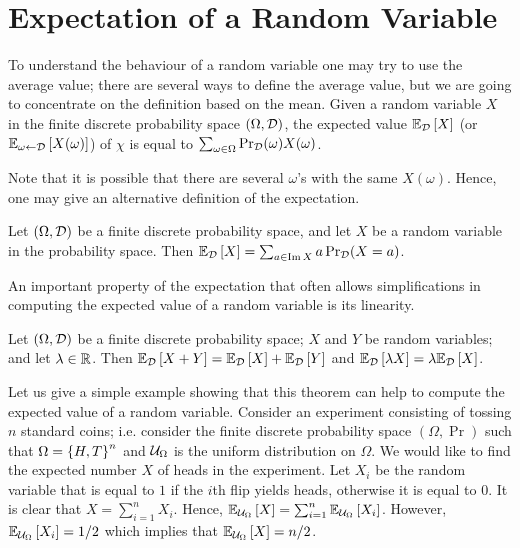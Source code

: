 \chapter{Expectation of a Random Variable}
\label{chapter:expectation}
To understand the behaviour of a random variable one may try to use the average
value; there are several ways to define the average value, but we are going to
concentrate on the definition based on the mean. Given a random variable $X$
in the finite discrete probability space $(\Omega, \Distribution{D})$, the
expected value $\expectation[\Distribution{D}]{X}$ 
(or $\expectation[\omega \gets \Distribution{D}]{X(\omega)}$) of $\chi$ is equal to
$\sum_{\omega \in \Omega} \Pr_{\Distribution{D}}(\omega) X(\omega)$.

Note that it is possible that there are several $\omega$'s with the same
$X(\omega)$. Hence, one may give an alternative definition of the expectation.
\begin{theorem}
  Let $(\Omega, \Distribution{D})$ be a finite discrete probability space, and
  let $X$ be a random variable in the probability space. Then
  $\expectation[\Distribution{D}]{X} =
  \sum_{a \in \Im X} a\Pr_{\Distribution{D}}(X = a)$.
\end{theorem}

An important property of the expectation that often allows simplifications in
computing the expected value of a random variable is its linearity.
\begin{theorem}
  Let $(\Omega, \Distribution{D})$ be a finite discrete probability space; $X$
  and $Y$ be random variables; and let $\lambda \in \R$.
  Then $\expectation[\Distribution{D}]{X + Y} = 
    \expectation[\Distribution{D}]{X} + \expectation[\Distribution{D}]{Y}$ and
  $\expectation[\Distribution{D}]{\lambda X} = \lambda
  \expectation[\Distribution{D}]{X}$.
\end{theorem}
Let us give a simple example showing that this theorem can help to compute the
expected value of a random variable. Consider an experiment consisting of
tossing $n$ standard coins; i.e. consider the finite discrete probability space
$(\Omega, \Pr)$ such that $\Omega = \set{H, T}^n$ and $\Uniform{\Omega}$ is the
uniform distribution on $\Omega$. We would like to find the expected number $X$
of heads in the experiment. Let $X_i$ be the random variable that is equal to
$1$ if the $i$th flip yields heads, otherwise it is equal to $0$. It is clear
that $X = \sum_{i = 1}^n X_i$. Hence, $\expectation[\Uniform{\Omega}]{X} = 
\sum_{i = 1}^n \expectation[\Uniform{\Omega}]{X_i}$.
However, $\expectation[\Uniform{\Omega}]{X_i} = 1 / 2$ which implies that
$\expectation[\Uniform{\Omega}]{X} = n / 2$.

